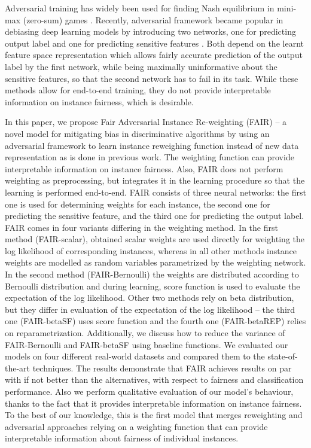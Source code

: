 \documentclass[preprint,12pt]{elsarticle}
\begin{document}
Adversarial training has widely been used for finding Nash equilibrium in mini-max (zero-sum) games \cite{goodfellow2014generative, nouiehed2019solving, hsieh2019finding}. Recently, adversarial framework became popular in debiasing deep learning models by introducing two networks, one for predicting output label and one for predicting sensitive features \cite{wadsworth2018achieving, madras2018learning, cevora2020fair, grari2020adversarial}. Both depend on the learnt feature space representation which allows fairly accurate prediction of the output label by the first network, while being maximally uninformative about the sensitive features, so that the second network has to fail in its task. While these methods allow for end-to-end training, they do not provide interpretable information on instance fairness, which is desirable.

In this paper, we propose Fair Adversarial Instance Re-weighting (FAIR) -- a novel model for mitigating bias in discriminative algorithms by using an adversarial framework to learn instance reweighing function instead of new data representation as is done in previous work. The weighting function can provide interpretable information on instance fairness. Also, FAIR does not perform weighting as preprocessing, but integrates it in the learning procedure so that the learning is performed end-to-end. FAIR consists of three neural networks: the first one is used for determining weights for each instance, the second one for predicting the sensitive feature, and the third one for predicting the output label. FAIR comes in four variants differing in the weighting method. In the first method (FAIR-scalar), obtained scalar weights are used directly for weighting the log likelihood of corresponding instances, whereas in all other methods instance weights are modelled as random variables parametrized by the weighting network. In the second method (FAIR-Bernoulli) the weights are distributed according to Bernoulli distribution and during learning, score function is used to evaluate the expectation of the log likelihood. Other two methods rely on beta distribution, but they differ in evaluation of the expectation of the log likelihood -- the third one (FAIR-betaSF) uses score function and the fourth one (FAIR-betaREP) relies on reparametrization. Additionally, we discuss how to reduce the variance of FAIR-Bernoulli and FAIR-betaSF using baseline functions. We evaluated our models on four different real-world datasets and compared them to the state-of-the-art techniques. The results demonstrate that FAIR achieves results on par with if not better than the alternatives, with respect to fairness and classification performance. Also we perform qualitative evaluation of our model's behaviour, thanks to the fact that
it provides interpretable information on instance fairness.
To the best of our knowledge, this is the first model that merges reweighting and adversarial approaches relying on a weighting function that can provide interpretable information about fairness of individual instances.
\end{document}
